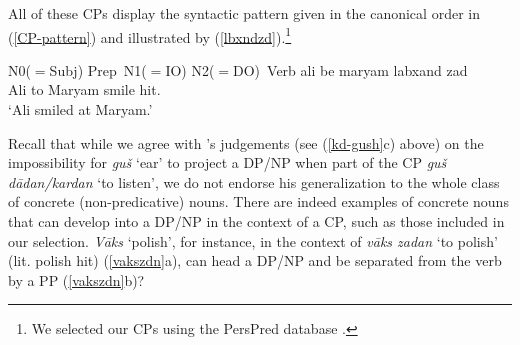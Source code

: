 \documentclass[output=paper]{langsci/langscibook}
\begin{document}
All of these CPs display the syntactic pattern given in the canonical order in (\ref{CP-pattern}) and illustrated by (\ref{lbxndzd}).\footnote{We selected our CPs using the PersPred database \citep{SamFag2013}.}

\begin{exe}
	\ex\label{CP-pattern}
	N0($=$Subj) Prep~N1($=$IO) N2($=$DO)~Verb
	\ex\label{lbxndzd}
	\gll ali be maryam labxand zad\\
	Ali to Maryam smile hit.\\
	\glt	`Ali smiled at Maryam.'	
\end{exe}

Recall that while we agree with \citeauthor{Karimi-Doostan1997}'s judgements (see (\ref{kd-gush}c) above) on the impossibility for \textit{gu\v{s}} `ear' to project a DP/NP when part of the CP \textit{gu\v{s} d\=adan/kardan} `to listen', we do not endorse his generalization to the whole class of concrete (non-predicative) nouns. There are indeed examples of concrete nouns that can develop into a DP/NP in the context of a CP, such as those included in our selection. \textit{V\=aks} `polish', for instance, in the context of \textit{v\=aks zadan} `to polish' (lit. polish hit) (\ref{vakszdn}a), can head a DP/NP and be separated from the verb by a PP (\ref{vakszdn}b)?

\begin{exe}
	\ex\label{vakszdn}
	\begin{xlist}
	\end{xlist}
\end{exe}
\end{document}
